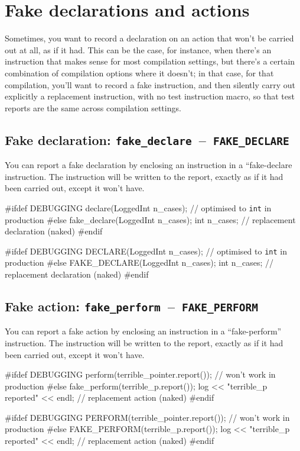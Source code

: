 \documentclass[twoside, a4paper, article]{memoir}
\newcommand*\testudocolor{\color{red!80!blue}}
\newcommand*\testudo[1]{\texttt{\testudocolor{}#1}}
\newcommand*\testudopair[2]{\testudo{#1}~--~\testudo{#2}}
\newcommand\subsectiontestudopair[3]{%
  \subsection[#1]{#1: \testudopair{#2}{#3}}}
\begin{document}
\section{Fake declarations and actions}
\label{sec:fake-declarations-actions}

Sometimes, you want to record a declaration on an action that won't be carried
out at all, as if it had.  This can be the case, for instance, when there's an
instruction that makes sense for most compilation settings, but there's a
certain combination of compilation options where it doesn't; in that case, for
that compilation, you'll want to record a fake instruction, and then silently
carry out explicitly a replacement instruction, with no test instruction macro,
so that test reports are the same across compilation settings.

\subsectiontestudopair{Fake declaration}{fake\_declare}{FAKE\_DECLARE}
\label{sec:fake-action}

You can report a fake declaration by enclosing an instruction in a
``fake-declare instruction.  The instruction will be written to the report,
exactly as if it had been carried out, except it won't have.
\begin{cpplisting}
#ifdef DEBUGGING
declare(LoggedInt n_cases); // optimised to \texttt{int} in production
#else
fake_declare(LoggedInt n_cases);
int n_cases; // replacement declaration (naked)
#endif
\end{cpplisting}

\begin{cpplisting}
#ifdef DEBUGGING
DECLARE(LoggedInt n_cases); // optimised to \texttt{int} in production
#else
FAKE_DECLARE(LoggedInt n_cases);
int n_cases; // replacement declaration (naked)
#endif
\end{cpplisting}


\subsectiontestudopair{Fake action}{fake\_perform}{FAKE\_PERFORM}
\label{sec:fake-action}

You can report a fake action by enclosing an instruction in a ``fake-perform''
instruction.  The instruction will be written to the report, exactly as if it
had been carried out, except it won't have.
\begin{cpplisting}
#ifdef DEBUGGING
perform(terrible_pointer.report()); // won't work in production
#else
fake_perform(terrible_p.report());
log << "terrible_p reported" << endl; // replacement action (naked)
#endif
\end{cpplisting}

\begin{cpplisting}
#ifdef DEBUGGING
PERFORM(terrible_pointer.report()); // won't work in production
#else
FAKE_PERFORM(terrible_p.report());
log << "terrible_p reported" << endl; // replacement action (naked)
#endif
\end{cpplisting}
\end{document}
